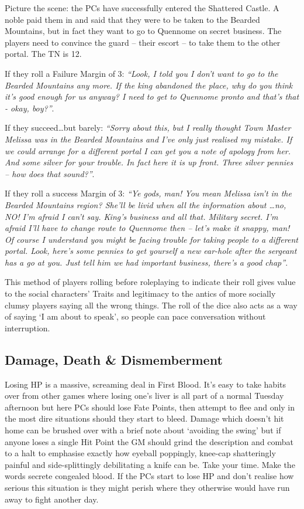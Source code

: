 Picture the scene: the PCs have successfully entered the Shattered Castle.  A noble paid them in and said that they were to be taken to the Bearded Mountains, but in fact they want to go to Quennome on secret business.  The players need to convince the guard -- their escort -- to take them to the other portal.  The TN is 12.

If they roll a Failure Margin of 3: \textit{``Look, I told you I don't want to go to the Bearded Mountains any more.  If the king abandoned the place, why do you think it's good enough for us anyway?  I need to get to Quennome pronto and that's that - okay, boy?''}.

If they succeed\ldots but barely: \textit{``Sorry about this, but I really thought Town Master Melissa was in the Bearded Mountains and I've only just realised my mistake.  If we could arrange for a different portal I can get you a note of apology from her.  And some silver for your trouble.  In fact here it is up front.  Three silver pennies -- how does that sound?''}.

If they roll a success Margin of 3: \textit{``Ye gods, man!  You mean Melissa isn't in the Bearded Mountains region?  She'll be livid when all the information about \dots no, NO! I'm afraid I can't say.  King's business and all that.  Military secret.  I'm afraid I'll have to change route to Quennome then -- let's make it snappy, man!  Of course I understand you might be facing trouble for taking people to a different portal.  Look, here's some pennies to get yourself a new ear-hole after the sergeant has a go at you.  Just tell him we had important business, there's a good chap''}.

This method of players rolling before roleplaying to indicate their roll gives value to the social characters' Traits and legitimacy to the antics of more socially clumsy players saying all the wrong things.  The roll of the dice also acts as a way of saying `I am about to speak', so people can pace conversation without interruption.

\subsection{Damage, Death \& Dismemberment}

Losing HP is a massive, screaming deal in First Blood.  It's easy to take habits over from other games where losing one's liver is all part of a normal Tuesday afternoon but here PCs should lose Fate Points, then attempt to flee and only in the most dire situations should they start to bleed.  Damage which doesn't hit home can be brushed over with a brief note about `avoiding the swing' but if anyone loses a single Hit Point the GM should grind the description and combat to a halt to emphasise exactly how eyeball poppingly, knee-cap shatteringly painful and side-splittingly debilitating a knife can be.  Take your time.  Make the words secrete congealed blood.  If the PCs start to lose HP and don't realise how serious this situation is they might perish where they otherwise would have run away to fight another day.

